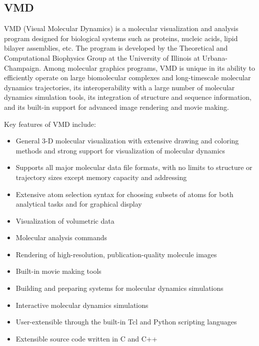 \subsection{VMD}
VMD (Visual Molecular Dynamics) is a molecular visualization and analysis program designed for biological systems such as proteins, nucleic acids, lipid bilayer assemblies, etc. The program is developed by the Theoretical and Computational Biophysics Group at the University of Illinois at Urbana-Champaign. Among molecular graphics programs, VMD is unique in its ability to efficiently operate on large biomolecular complexes and long-timescale molecular dynamics trajectories, its interoperability with a large number of molecular dynamics simulation tools, its integration of structure and sequence information, and its built-in support for advanced image rendering and movie making.

Key features of VMD include:
\begin{itemize}
\item General 3-D molecular visualization with extensive drawing and coloring methods and strong support for visualization of molecular dynamics
\item Supports all major molecular data file formats, with no limits to structure or trajectory sizes except memory capacity and addressing
\item Extensive atom selection syntax for choosing subsets of atoms for both analytical tasks and for graphical display
\item Visualization of volumetric data
\item Molecular analysis commands
\item Rendering of high-resolution, publication-quality molecule images
\item Built-in movie making tools
\item Building and preparing systems for molecular dynamics simulations
\item Interactive molecular dynamics simulations
\item User-extensible through the built-in Tcl and Python scripting languages
\item Extensible source code written in C and C++
\end{itemize}

